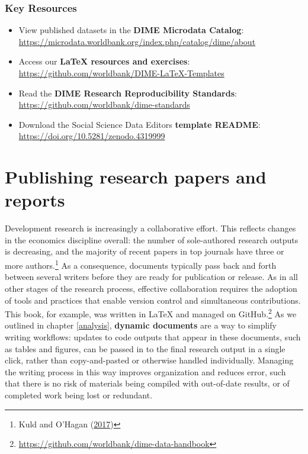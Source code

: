 \documentclass[
]{book}
\providecommand{\tightlist}{%
  \setlength{\itemsep}{0pt}\setlength{\parskip}{0pt}}
\begin{document}
\begin{summary}
\hypertarget{key-resources-6}{%
\subsubsection*{Key Resources}\label{key-resources-6}}

\begin{itemize}
\tightlist
\item
  View published datasets in the \textbf{DIME Microdata Catalog}: \url{https://microdata.worldbank.org/index.php/catalog/dime/about}
\item
  Access our \textbf{LaTeX resources and exercises}: \url{https://github.com/worldbank/DIME-LaTeX-Templates}
\item
  Read the \textbf{DIME Research Reproducibility Standards}: \url{https://github.com/worldbank/dime-standards}
\item
  Download the Social Science Data Editors \textbf{template README}: \url{https://doi.org/10.5281/zenodo.4319999}
\end{itemize}
\end{summary}

\hypertarget{publishing-research-papers-and-reports}{%
\section*{Publishing research papers and reports}\label{publishing-research-papers-and-reports}}

Development research is increasingly a collaborative effort.
This reflects changes in the economics discipline overall:
the number of sole-authored research outputs is decreasing,
and the majority of recent papers in top journals have three or more
authors.\footnote{Kuld and O'Hagan (\protect\hyperlink{ref-kuldtrend}{2017})}
As a consequence, documents typically pass back and forth between several writers
before they are ready for publication or release.
As in all other stages of the research process,
effective collaboration requires the adoption of tools and practices
that enable version control and simultaneous contributions.
This book, for example, was written in LaTeX and managed on GitHub.\footnote{\url{https://github.com/worldbank/dime-data-handbook}}
As we outlined in chapter \ref{analysis},
\textbf{dynamic documents} are a way to simplify writing workflows:
updates to code outputs that appear in these documents, such as tables and figures,
can be passed in to the final research output in a single click,
rather than copy-and-pasted or otherwise handled individually.
Managing the writing process in this way
improves organization and reduces error,
such that there is no risk of materials being compiled
with out-of-date results, or of completed work being lost or redundant.
\end{document}
